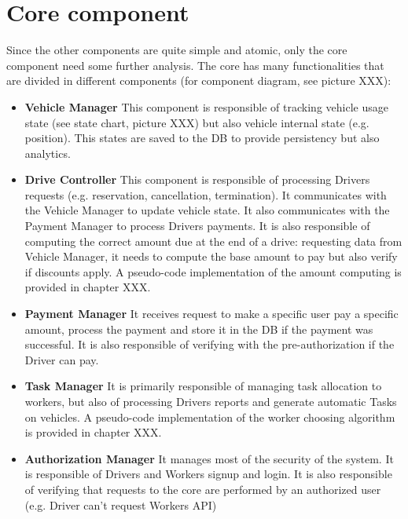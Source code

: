 \section {Core component}
Since the other components are quite simple and atomic, only the core component need some further analysis. The core has many functionalities that are divided in different components (for component diagram, see picture XXX):
\begin{itemize}
\item \textbf{Vehicle Manager} This component is responsible of tracking vehicle usage state (see state chart, picture XXX) but also vehicle internal state (e.g. position). This states are saved to the DB to provide persistency but also analytics. 
\item \textbf{Drive Controller} This component is responsible of processing Drivers requests (e.g. reservation, cancellation, termination). It communicates with the Vehicle Manager to update vehicle state. It also communicates with the Payment Manager to process Drivers payments. It is also responsible of computing the correct amount due at the end of a drive: requesting data from Vehicle Manager, it needs to compute the base amount to pay but also verify if discounts apply. A pseudo-code implementation of the amount computing is provided in chapter XXX.
\item \textbf{Payment Manager} It receives request to make a specific user pay a specific amount, process the payment and store it in the DB if the payment was successful. It is also responsible of verifying with the pre-authorization if the Driver can pay. 
\item \textbf{Task Manager} It is primarily responsible of managing task allocation to workers, but also of processing Drivers reports and generate automatic Tasks on vehicles. A pseudo-code implementation of the worker choosing algorithm is provided in chapter XXX.
\item \textbf{Authorization Manager} It manages most of the security of the system. It is responsible of Drivers and Workers signup and login. It is also responsible of verifying that requests to the core are performed by an authorized user (e.g. Driver can't request Workers API) 
\end{itemize}